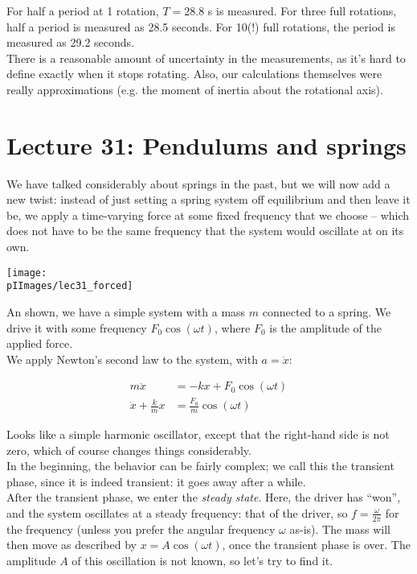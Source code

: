 For half a period at 1 rotation, $T = 28.8$ s is measured. For three full rotations, half a period is measured as 28.5 seconds. For 10(!) full rotations, the period is measured as 29.2 seconds.\\
There is a reasonable amount of uncertainty in the measurements, as it's hard to define exactly when it stops rotating. Also, our calculations themselves were really approximations (e.g. the moment of inertia about the rotational axis).

\section{Lecture 31: Pendulums and springs}

We have talked considerably about springs in the past, but we will now add a new twist: instead of just setting a spring system off equilibrium and then leave it be, we apply a time-varying force at some fixed frequency that we choose -- which does not have to be the same frequency that the system would oscillate at on its own.

\begin{center}
\texttt{[image: \\pIImages/lec31\_forced]}
\end{center}

An shown, we have a simple system with a mass $m$ connected to a spring. We drive it with some frequency $F_0 \cos (\omega t)$, where $F_0$ is the amplitude of the applied force.\\
We apply Newton's second law to the system, with $a = \ddot{x}$:

\begin{align}
m \ddot{x} &= - k x + F_0 \cos (\omega t)\\
\ddot{x} + \frac{k}{m} x &=  \frac{F_0}{m} \cos (\omega t)
\end{align}

Looks like a simple harmonic oscillator, except that the right-hand side is not zero, which of course changes things considerably.\\
In the beginning, the behavior can be fairly complex; we call this the transient phase, since it is indeed transient: it goes away after a while.\\
After the transient phase, we enter the \emph{steady state}. Here, the driver has ``won'', and the system oscillates at a steady frequency: that of the driver, so $\displaystyle f = \frac{\omega}{2 \pi}$ for the frequency (unless you prefer the angular frequency $\omega$ as-is). The mass will then move as described by $x = A \cos (\omega t)$, once the transient phase is over. The amplitude $A$ of this oscillation is not known, so let's try to find it.


